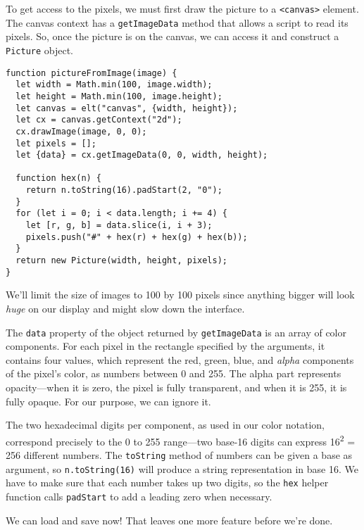 To get access to the pixels, we must first draw the picture to a \lstinline`<canvas>` element. The canvas context has a \lstinline`getImageData` method that allows a script to read its pixels. So, once the picture is on the canvas, we can access it and construct a \lstinline`Picture` object.

\begin{lstlisting}
function pictureFromImage(image) {
  let width = Math.min(100, image.width);
  let height = Math.min(100, image.height);
  let canvas = elt("canvas", {width, height});
  let cx = canvas.getContext("2d");
  cx.drawImage(image, 0, 0);
  let pixels = [];
  let {data} = cx.getImageData(0, 0, width, height);

  function hex(n) {
    return n.toString(16).padStart(2, "0");
  }
  for (let i = 0; i < data.length; i += 4) {
    let [r, g, b] = data.slice(i, i + 3);
    pixels.push("#" + hex(r) + hex(g) + hex(b));
  }
  return new Picture(width, height, pixels);
}
\end{lstlisting}
\noindent

We'll limit the size of images to 100 by 100 pixels since anything bigger will look \emph{huge} on our display and might slow down the interface.

The \lstinline`data` property of the object returned by \lstinline`getImageData` is an array of color components. For each pixel in the rectangle specified by the arguments, it contains four values, which represent the red, green, blue, and \emph{alpha} components of the pixel's color, as numbers between 0 and 255. The alpha part represents opacity—when it is zero, the pixel is fully transparent, and when it is 255, it is fully opaque. For our purpose, we can ignore it.

The two hexadecimal digits per component, as used in our color notation, correspond precisely to the 0 to 255 range—two base-16 digits can express 16\textsuperscript{2} = 256 different numbers. The \lstinline`toString` method of numbers can be given a base as argument, so \lstinline`n.toString(16)` will produce a string representation in base 16. We have to make sure that each number takes up two digits, so the \lstinline`hex` helper function calls \lstinline`padStart` to add a leading zero when necessary.

We can load and save now! That leaves one more feature before we're done.

